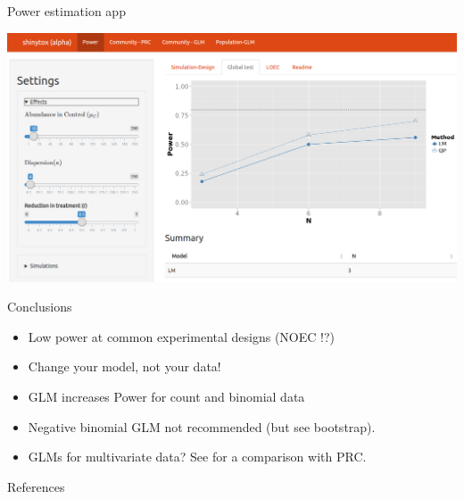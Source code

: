 \documentclass[final,t]{beamer}
\begin{document}
\begin{frame}{}
\begin{columns}[t]
\begin{column}{.48\linewidth}
    \begin{block}{Power estimation app}
        \begin{center}
          \includegraphics[width=0.7\linewidth]{fig/shinytox.png}
        \end{center}
        \vskip -0.5cm
    \end{block}
  
    \begin{alertblock}{Conclusions}
        \begin{itemize}
            \item Low power at common experimental designs (NOEC !?)
            \item Change your model, not your data!
            \item GLM increases Power for  count and binomial data
            \item Negative binomial GLM not recommended (but see bootstrap).
            \item GLMs for multivariate data?  See \cite{szocs_analysing_2015} for a comparison with PRC.
        \end{itemize}
    \end{alertblock}

    \begin{block}{References}
    \vskip -0.5cm
        \small     
        
          
       \vskip -0.5cm
    \end{block}


\end{column}
\end{columns}
\end{frame}
\end{document}

